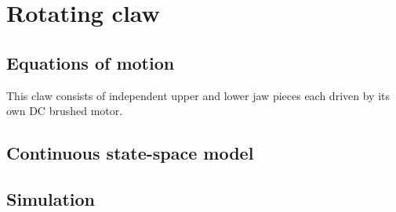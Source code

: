\section{Rotating claw}

\subsection{Equations of motion}

This claw consists of independent upper and lower jaw pieces each driven by its
own DC brushed motor.

\subsection{Continuous state-space model}

\subsection{Simulation}
